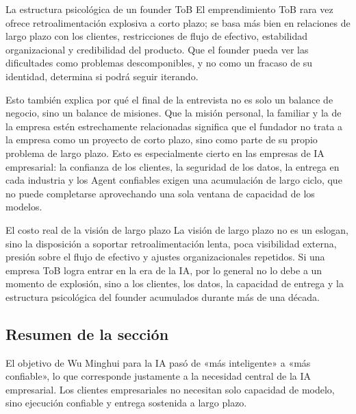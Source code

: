 \begin{knowledgebox}{La estructura psicológica de un founder ToB}
El emprendimiento ToB rara vez ofrece retroalimentación explosiva a corto plazo; se basa más bien en relaciones de largo plazo con los clientes, restricciones de flujo de efectivo, estabilidad organizacional y credibilidad del producto. Que el founder pueda ver las dificultades como problemas descomponibles, y no como un fracaso de su identidad, determina si podrá seguir iterando.
\end{knowledgebox}

Esto también explica por qué el final de la entrevista no es solo un balance de negocio, sino un balance de misiones. Que la misión personal, la familiar y la de la empresa estén estrechamente relacionadas significa que el fundador no trata a la empresa como un proyecto de corto plazo, sino como parte de su propio problema de largo plazo. Esto es especialmente cierto en las empresas de IA empresarial: la confianza de los clientes, la seguridad de los datos, la entrega en cada industria y los Agent confiables exigen una acumulación de largo ciclo, que no puede completarse aprovechando una sola ventana de capacidad de los modelos.

\begin{importantbox}{El costo real de la visión de largo plazo}
La visión de largo plazo no es un eslogan, sino la disposición a soportar retroalimentación lenta, poca visibilidad externa, presión sobre el flujo de efectivo y ajustes organizacionales repetidos. Si una empresa ToB logra entrar en la era de la IA, por lo general no lo debe a un momento de explosión, sino a los clientes, los datos, la capacidad de entrega y la estructura psicológica del founder acumulados durante más de una década.
\end{importantbox}

\subsection{Resumen de la sección}

El objetivo de Wu Minghui para la IA pasó de «más inteligente» a «más confiable», lo que corresponde justamente a la necesidad central de la IA empresarial. Los clientes empresariales no necesitan solo capacidad de modelo, sino ejecución confiable y entrega sostenida a largo plazo.
